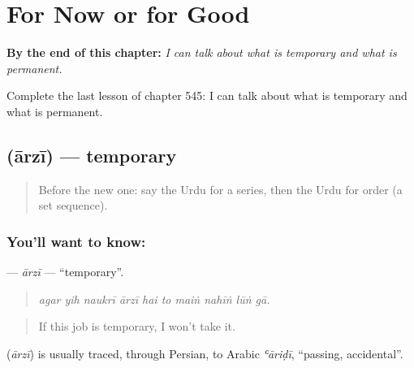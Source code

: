 
\chapter{For Now or for Good}
\label{ch:ur-for-now-or-for-good}

\begin{chapteropening}
\textbf{By the end of this chapter:} \emph{I can talk about what is temporary and what is permanent.}

Complete the last lesson of chapter 545: I can talk about what is temporary and what is permanent.
\end{chapteropening}

\section[\texorpdfstring{\ur{عارضی} (ārzī)}{عارضی (ārzī)}]{ (ārzī) — temporary}

\label{lesson:UR-C545-arzi}



\begin{quote}
Before the new one: say the Urdu for a series, then the Urdu for order (a set sequence).
\end{quote}

\subsection*{You'll want to know: }
\textbf{} — \emph{ārzī} — \textquotedblleft{}temporary\textquotedblright{}.

\begin{quote}
         
\end{quote}

\begin{quote}
\emph{agar yih naukrī ārzī hai to maiṅ nahīṅ lūṅ gā.}
\end{quote}

\begin{quote}
If this job is temporary, I won't take it.
\end{quote}

\begin{cousinweb}
\textbf{} (\emph{ārzī}) is usually traced, through Persian, to Arabic \emph{ʿāriḍī}, \textquotedblleft{}passing, accidental\textquotedblright{}.
\end{cousinweb}

